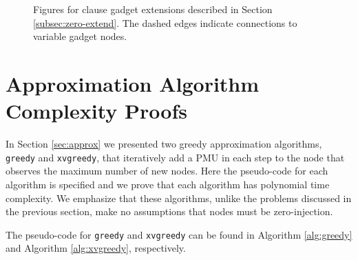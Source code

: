 \begin{figure}[t]
  \begin{center}
  \end{center}
	\caption{Figures for clause gadget extensions described in Section \ref{subsec:zero-extend}. The dashed edges indicate connections to variable gadget nodes. }
  \label{fig:zero-clause-extended}
\end{figure}

\section{Approximation Algorithm Complexity Proofs}
\label{sec:appendix-approx}

In Section \ref{sec:approx} we presented two greedy approximation algorithms, {\tt greedy} and {\tt xvgreedy}, that iteratively add a PMU in each step to the node that
observes the maximum number of new nodes.  Here the pseudo-code for each algorithm is specified and we prove that each algorithm has polynomial time complexity.  We emphasize
that these algorithms, unlike the problems discussed in the previous section, make no assumptions that nodes must be zero-injection.

The pseudo-code for {\tt greedy} and {\tt xvgreedy} can be found in Algorithm \ref{alg:greedy} and Algorithm \ref{alg:xvgreedy}, respectively.


